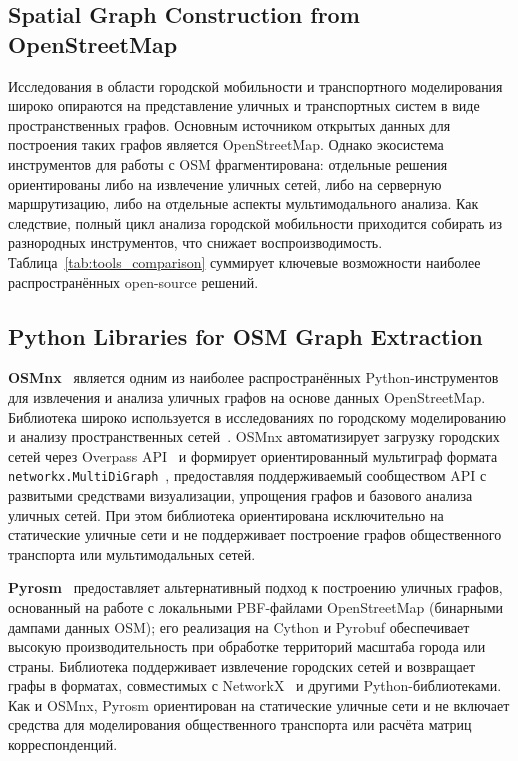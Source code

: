 \documentclass[sigconf,nonacm]{acmart}
\begin{document}
    \subsection{Spatial Graph Construction from OpenStreetMap}
    \label{subsec:spatial-graph-construction-from-openstreetmap2}

    Исследования в области городской мобильности и транспортного моделирования широко опираются на представление уличных
    и транспортных систем в виде пространственных графов.
    Основным источником открытых данных для построения таких графов является OpenStreetMap.
    Однако экосистема инструментов для работы с OSM фрагментирована: отдельные решения ориентированы либо на извлечение уличных сетей,
    либо на серверную маршрутизацию, либо на отдельные аспекты мультимодального анализа.
    Как следствие, полный цикл анализа городской мобильности приходится собирать из разнородных инструментов, что снижает воспроизводимость.
    Таблица~\ref{tab:tools_comparison} суммирует ключевые возможности наиболее распространённых open-source решений.

    \subsection{Python Libraries for OSM Graph Extraction}
    \label{subsec:python-libraries-for-osm-graph-extraction}

    \textbf{OSMnx}~\cite{boeing2025osmnx} является одним из наиболее распространённых Python-инструментов для извлечения
    и анализа уличных графов на основе данных OpenStreetMap.
    Библиотека широко используется в исследованиях по городскому моделированию и анализу пространственных сетей~\cite{coutrot2022, nilsson2019, feng2020, liao2020}.
    OSMnx автоматизирует загрузку городских сетей через Overpass API~\cite{overpass_api} и формирует ориентированный
    мультиграф формата \texttt{networkx.MultiDiGraph}~\cite{hagberg2008networkx}, предоставляя поддерживаемый
    сообществом API с развитыми средствами визуализации, упрощения графов и базового анализа уличных сетей.
    При этом библиотека ориентирована исключительно на статические уличные сети и не поддерживает построение графов
    общественного транспорта или мультимодальных сетей.

    \textbf{Pyrosm}~\cite{pyrosm_docs} предоставляет альтернативный подход к построению уличных графов, основанный на работе
    с локальными PBF-файлами OpenStreetMap (бинарными дампами данных OSM); его реализация на Cython и Pyrobuf обеспечивает
    высокую производительность при обработке территорий масштаба города или страны.
    Библиотека поддерживает извлечение городских сетей и возвращает графы в форматах, совместимых с NetworkX~\cite{hagberg2008networkx} и другими Python-библиотеками.
    Как и OSMnx, Pyrosm ориентирован на статические уличные сети и не включает средства для моделирования общественного
    транспорта или расчёта матриц корреспонденций.
\end{document}
